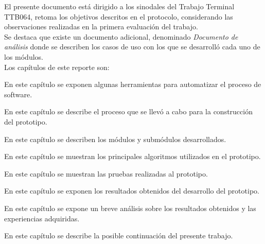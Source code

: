 	El presente documento está dirigido a los sinodales del Trabajo Terminal TTB064, retoma los objetivos descritos en el protocolo, considerando las observaciones realizadas en la primera evaluación del trabajo.\\
	
	Se destaca que existe un documento adicional, denominado {\it Documento de análisis} donde se describen los casos de uso con los que se desarrolló cada uno de los módulos.\\
	
	Los capítulos de este reporte son:

\begin{Citemize}
	\item {} En este capítulo se exponen algunas herramientas para automatizar el proceso de software.
	\item {} En este capítulo se describe el proceso que se llevó a cabo para la construcción del prototipo.
	\item {} En este capítulo se describen los módulos y submódulos desarrollados.
	\item {} En este capítulo se muestran los principales algoritmos utilizados en el prototipo.
	\item {} En este capítulo se muestran las pruebas realizadas al prototipo.
	\item {} En este capítulo se exponen los resultados obtenidos del desarrollo del prototipo.
	\item {} En este capítulo se expone un breve análisis sobre los resultados obtenidos y las experiencias adquiridas.
	\item {} En este capítulo se describe la posible continuación del presente trabajo.

\end{Citemize}


